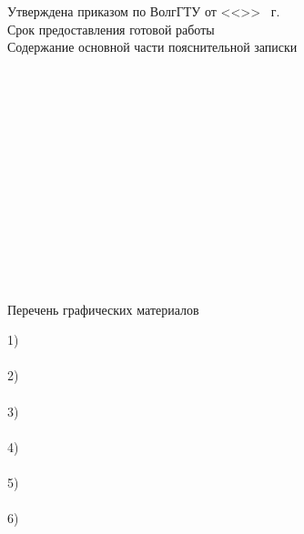 \begin{titlepage}
    \vspace{0.5em}\hspace*{12mm}\underline{}\\
    \vspace{0.5em}\hspace*{12mm}\underline{\hspace{0.93\textwidth}}\\
    \vspace{1em}Утверждена приказом по ВолгГТУ от <<\LINE{1em}>> \underline{\hspace{4em}}
        \the\year\ г. \textnumero \LINE{7em}\\
    Срок предоставления готовой работы \\
    Содержание основной части пояснительной записки\\
    \LINE{\textwidth}\\\LINE{\textwidth}\\\LINE{\textwidth}\\\LINE{\textwidth}\\\LINE{\textwidth}\\
    \LINE{\textwidth}\\\LINE{\textwidth}\\\LINE{\textwidth}\\\LINE{\textwidth}\\\LINE{\textwidth}\\
    \LINE{\textwidth}\\\LINE{\textwidth}\\\LINE{\textwidth}\\
    \newpage
    \thispagestyle{empty}
    \begin{center}
        Перечень графических материалов
    \end{center}
    1) \\\LINE{\textwidth}\\
    2) \\\LINE{\textwidth}\\
    3) \\\LINE{\textwidth}\\
    4) \\\LINE{\textwidth}\\
    5) \\\LINE{\textwidth}\\
    6) \\\LINE{\textwidth}\\

\end{titlepage}
